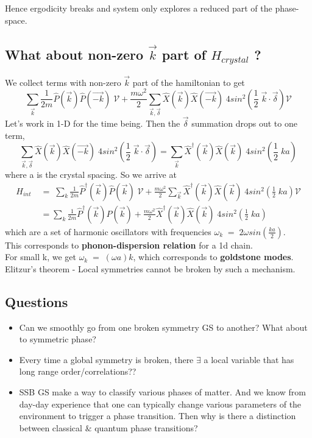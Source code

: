 \documentclass[12pt]{article}
\begin{document}
Hence ergodicity breaks and system only explores a reduced part of the phase-space.
\newpage

\subsection{What about non-zero $\vec{k}$ part of $H_{crystal}$ ?}
We collect terms with non-zero $\vec{k}$ part of the hamiltonian to get
\begin{equation}
    \sum_{\Vec{k}} \frac{1}{2m}\hat{P}(\Vec{k}) \hat{P}(\Vec{-k}) \;\mathcal{V} + \frac{m\omega^2}{2} \sum_{\vec{k}, \vec{\delta}} \hat{X}(\vec{k})\hat{X}(\vec{-k})\; 4sin^2(\frac{1}{2}\;\vec{k}\cdot\vec{\delta}) \mathcal{V}
\end{equation}
Let's work in 1-D for the time being. Then the $\vec{\delta}$ summation drops out to one term, 
\begin{equation*}
   \sum_{\vec{k}, \vec{\delta}} \hat{X}(\vec{k})\hat{X}(\vec{-k})\; 4sin^2(\frac{1}{2}\;\vec{k}\cdot\vec{\delta}) = \sum_{\vec{k}} \hat{X}^{\dagger}(\vec{k})\hat{X}(\vec{k})\; 4sin^2(\frac{1}{2}\;ka)
\end{equation*}
where a is the crystal spacing. So we arrive at
\begin{align}
    H_{int}\;&=\;\sum_{{k}} \displaystyle{\frac{1}{2m}}\hat{P}^{\dagger}(\Vec{k}) \hat{P}(\Vec{k}) \;\mathcal{V} + \frac{m\omega^2}{2} \sum_{\vec{k}} \hat{X}^{\dagger}(\vec{k})\hat{X}(\vec{k})\; 4sin^2(\frac{1}{2}\;ka)\mathcal{V}\\
    &= \sum_{{k}}\displaystyle{\frac{1}{2m}}\hat{P}^{\dagger}(\Vec{k}) \hat{P}(\Vec{k}) +  \frac{m\omega^2}{2} \hat{X}^{\dagger}(\vec{k})\hat{X}(\vec{k})\; 4sin^2(\frac{1}{2}\;ka)
\end{align}
which are a set of harmonic oscillators with frequencies $\omega_{k}\;=\;2\omega sin(\displaystyle{\frac{ka}{2}})$. \\
This corresponds to\textbf{ phonon-dispersion relation} for a 1d chain.\\
For small k, we get $\omega_k\;=\;(\omega a)k $, which corresponds to \textbf{goldstone modes}.\\
\newline
Elitzur's theorem - Local symmetries cannot be broken by such a mechanism.

\newpage
\subsection{Questions}

\begin{itemize}
    \item Can we smoothly go from one broken symmetry GS to another? What about to symmetric phase?
    \item Every time a global symmetry is broken, there $\exists$ a local variable that has long range order/correlations??
    \item SSB GS make a way to classify various phases of matter. And we know from day-day experience that one can typically change various parameters of the environment to trigger a phase transition. Then why is there a distinction between classical $\&$ quantum phase transitions?
\end{itemize}
\end{document}
